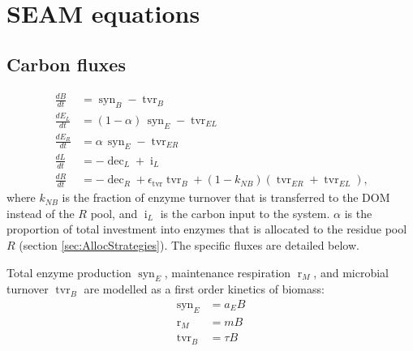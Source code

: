 \section{\\ \\ \hspace*{-7mm}  SEAM equations \label{app:SEAM}}    %

\subsection{Carbon fluxes}
\begin{subequations}
\label{eq:SEAM}
\begin{align}
\frac{dB}{dt} &= \operatorname{syn}_B - \operatorname{tvr}_B \\
\frac{dE_L}{dt} &= (1 - \alpha)  \, \operatorname{syn}_E -\operatorname{tvr}_{EL}\\
\frac{dE_R}{dt} &= \alpha \, \operatorname{syn}_E - \operatorname{tvr}_{ER} \\
\frac{dL}{dt} &=  - \operatorname{dec}_L + \operatorname{i}_L
\\
\frac{dR}{dt} &=  - \operatorname{dec}_R +
\epsilon_{\operatorname{tvr}}  \operatorname{tvr}_B + (1 -k_{NB})
(\operatorname{tvr}_{ER} + \operatorname{tvr}_{EL})
\text{,} 
\end{align}
\end{subequations}
where $k_{NB}$ is the fraction of enzyme turnover that is transferred to the
DOM instead of the $R$ pool, and $\operatorname{i}_L$ is the carbon input
to the system. $\alpha$ is the proportion of total investment into enzymes
that is allocated to the residue pool $R$ (section \ref{sec:AllocStrategies}).
The specific fluxes are detailed below.

Total enzyme production $\operatorname{syn}_E$, maintenance respiration
$\operatorname{r}_{M}$, and microbial turnover $\operatorname{tvr}_B$ are
modelled as a first order kinetics of biomass:
\begin{subequations}
\begin{align}
\label{eq:synE} \operatorname{syn}_E &= a_E B \\
\label{eq:rM} \operatorname{r}_{M} &= m B \\
\label{eq:tvrB} \operatorname{tvr}_B &= \tau B 
\end{align}
\end{subequations}

